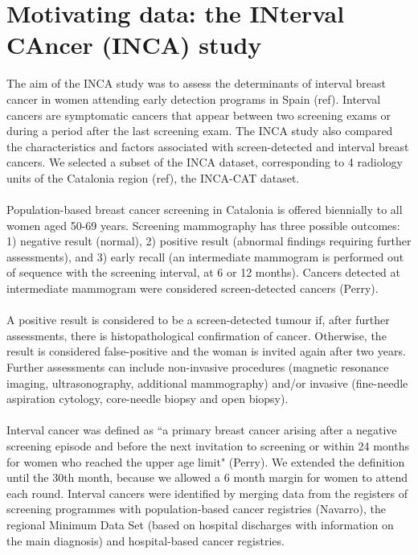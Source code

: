 \documentclass[10pt,a4paper]{article}
\begin{document}
\section{Motivating data: the INterval CAncer (INCA) study}
The aim of the INCA study was to assess the determinants of interval breast cancer in women attending early detection programs in Spain (ref). Interval cancers are symptomatic cancers that appear between two screening exams or during a period after the last screening exam. The INCA study also compared the characteristics and factors associated with screen-detected and interval breast cancers. We selected a subset of the INCA dataset, corresponding to 4 radiology units of the Catalonia region (ref), the INCA-CAT dataset. 

\paragraph{}Population-based breast cancer screening in Catalonia is offered biennially to all women aged 50-69 years. Screening mammography has three possible outcomes: 1) negative result (normal), 2) positive result (abnormal findings requiring further assessments), and 3) early recall (an intermediate mammogram is performed out of sequence with the screening interval, at 6 or 12 months). Cancers detected at intermediate mammogram were considered screen-detected cancers (Perry).

\paragraph{}A positive result is considered to be a screen-detected tumour if, after further assessments, there is histopathological confirmation of cancer. Otherwise, the result is considered false-positive and the woman is invited again after two years. Further assessments can include non-invasive procedures (magnetic resonance imaging, ultrasonography, additional mammography) and/or invasive (fine-needle aspiration cytology, core-needle biopsy and open biopsy). 

\paragraph{}Interval cancer was defined as ``a primary breast cancer arising after a negative screening episode and before the next invitation to screening or within 24 months for women who reached the upper age limit" (Perry). We extended the definition until the 30th month, because we allowed a 6 month margin for women to attend each round. Interval cancers were identified by merging data from the registers of screening programmes with population-based cancer registries (Navarro), the regional Minimum Data Set (based on hospital discharges with information on the main diagnosis) and hospital-based cancer registries.
\end{document}
